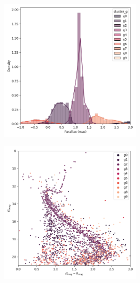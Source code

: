 \documentclass[11pt,a4paper,english,twocolumn]{article}
\begin{document}
\begin{figure}[htbp]
\begin{subfigure}{\columnwidth}
\begin{subfigure}[t]{0.30\textwidth}
      \includegraphics[width=\textwidth]{../figures/ngc_2682/dec_parallax_ngc_2682.png}
    \end{subfigure}
    \hfill
    \begin{subfigure}[t]{0.30\textwidth}
      \centering
      \includegraphics[width=\textwidth]{../figures/ngc_2682/dec_hr_diagram_ngc_2682.png}

\end{subfigure}
\end{subfigure}
\end{figure}
\end{document}
